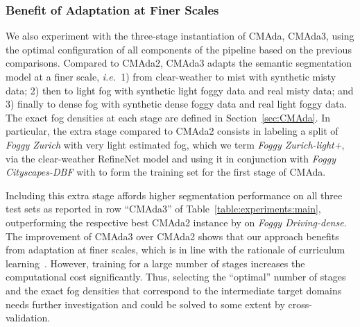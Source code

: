 \documentclass[twocolumn]{svjour3}          \smartqed  \usepackage{graphicx}
\newcommand{\ie}{\mbox{\emph{i.e.\ }}}
\begin{document}
\subsubsection{Benefit of Adaptation at Finer Scales}
\label{sec:benefit:finerscale}

We also experiment with the three-stage instantiation of CMAda, CMAda3, using the optimal configuration of all components of the pipeline based on the previous comparisons. Compared to CMAda2, CMAda3 adapts the semantic segmentation model at a finer scale, \ie{}1) from clear-weather to mist with synthetic misty data; 2) then to light fog with synthetic light foggy data and real misty data; and 3) finally to dense fog with synthetic dense foggy data and real light foggy data. The exact fog densities at each stage are defined in Section~\ref{sec:CMAda}. In particular, the extra stage compared to CMAda2 consists in labeling a split of \emph{Foggy Zurich} with very light estimated fog, which we term \emph{Foggy Zurich-light+}, via the clear-weather RefineNet model and using it in conjunction with \emph{Foggy Cityscapes-DBF} with  to form the training set for the first stage of CMAda.

Including this extra stage affords higher segmentation performance on all three test sets as reported in row ``CMAda3'' of Table~\ref{table:experiments:main}, outperforming the respective best CMAda2 instance by  on \emph{Foggy Driving-dense}. The improvement of CMAda3 over CMAda2 shows that our approach benefits from adaptation at finer scales, which is in line with the rationale of curriculum learning~\cite{curriculum:learning}. However, training for a large number of stages increases the computational cost significantly. Thus, selecting the ``optimal'' number of stages and the exact fog densities that correspond to the intermediate target domains needs further investigation and could be solved to some extent by cross-validation.
\end{document}
